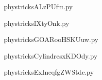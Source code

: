     

    \clearpage
    


    \newcommand{\CaptionFigALzPUfm}{<+Type your caption here+>}
    \begin{center}
        
    \end{center}
    phystricksALzPUfm.py

    

    \clearpage
    


    \newcommand{\CaptionFigIXtyOnk}{<+Type your caption here+>}
    \begin{center}
        
    \end{center}
    phystricksIXtyOnk.py

    

    \clearpage
    


    \newcommand{\CaptionFigGOARooHSKUuw}{<+Type your caption here+>}
    \begin{center}
        
    \end{center}
    phystricksGOARooHSKUuw.py

    

    \clearpage
    


    \newcommand{\CaptionFigCylindresxKDOdy}{<+Type your caption here+>}
    \begin{center}
        
    \end{center}
    phystricksCylindresxKDOdy.py

    

    \clearpage
    


    \newcommand{\CaptionFigExIneqfgZWStde}{<+Type your caption here+>}
    \begin{center}
        
    \end{center}
    phystricksExIneqfgZWStde.py

    

    \clearpage
    


